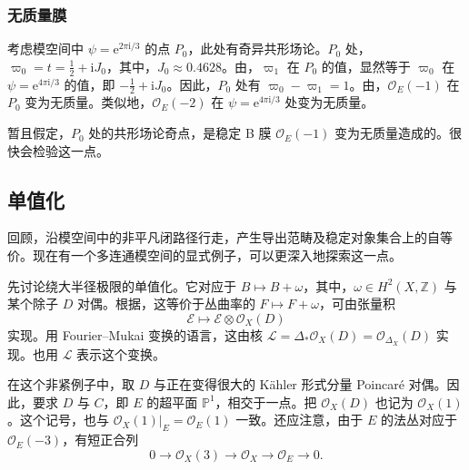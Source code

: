 \subsubsection{无质量膜}\label{sec:5.6.1.1}

考虑模空间中 $\psi=\mathrm{e}^{2\pi\mathrm{i}/3}$ 的点 $P_0$，此处有奇异共形场论。$P_0$ 处，$\varpi_0=t=\tfrac12+\mathrm{i}J_0$，其中，$J_0\approx0.4628$。由，$\varpi_1$ 在 $P_0$ 的值，显然等于 $\varpi_0$ 在 $\psi=\mathrm{e}^{4\pi\mathrm{i}/3}$ 的值，即 $-\tfrac12+\mathrm{i}J_0$。因此，$P_0$ 处有 $\varpi_0-\varpi_1=1$。由，$\mathcal{O}_E(-1)$ 在 $P_0$ 变为无质量。类似地，$\mathcal{O}_E(-2)$ 在 $\psi=\mathrm{e}^{4\pi\mathrm{i}/3}$ 处变为无质量。

暂且假定，$P_0$ 处的共形场论奇点，是稳定 B 膜 $\mathcal{O}_E(-1)$ 变为无质量造成的。很快会检验这一点。

\subsection{单值化}\label{sec:5.6.2}

回顾，沿模空间中的非平凡闭路径行走，产生导出范畴及稳定对象集合上的自等价。现在有一个多连通模空间的显式例子，可以更深入地探索这一点。

先讨论绕大半径极限的单值化。它对应于 $B\mapsto B+\omega$，其中，$\omega\in H^2(X,\mathbb{Z})$ 与某个除子 $D$ 对偶。根据，这等价于丛曲率的 $F\mapsto F+\omega$，可由张量积
\[
\mathcal{E}\longmapsto\mathcal{E}\otimes\mathcal{O}_X(D)
\]
实现。用 Fourier--Mukai 变换的语言，这由核 $\mathcal{L}=\Delta_*\mathcal{O}_X(D)=\mathcal{O}_{\Delta_X}(D)$ 实现。也用 $\mathcal{L}$ 表示这个变换。

在这个非紧例子中，取 $D$ 与正在变得很大的 K\"ahler 形式分量 Poincar\'e 对偶。因此，要求 $D$ 与 $C$，即 $E$ 的超平面 $\mathbb{P}^1$，相交于一点。把 $\mathcal{O}_X(D)$ 也记为 $\mathcal{O}_X(1)$。这个记号，也与 $\mathcal{O}_X(1)|_E=\mathcal{O}_E(1)$ 一致。还应注意，由于 $E$ 的法丛对应于 $\mathcal{O}_E(-3)$，有短正合列
\begin{equation}\label{eq:5.170}
0\longrightarrow\mathcal{O}_X(3)\longrightarrow\mathcal{O}_X
\longrightarrow\mathcal{O}_E\longrightarrow0.
\end{equation}

